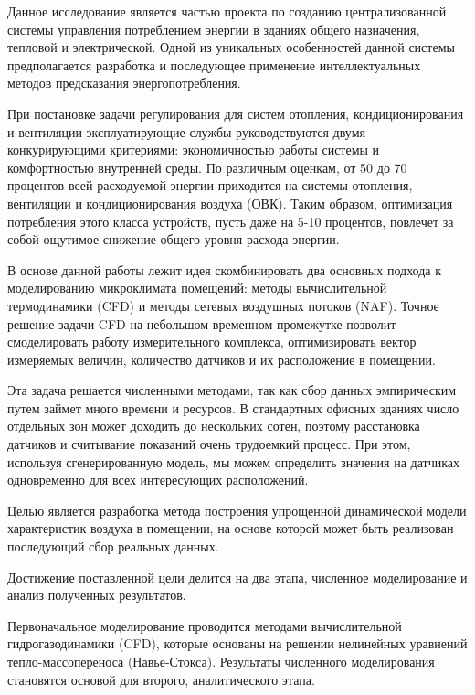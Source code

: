 
Данное исследование является частью проекта по созданию централизованной системы управления потреблением энергии в зданиях общего назначения, тепловой и электрической. Одной из уникальных особенностей данной системы предполагается разработка и последующее применение интеллектуальных методов предсказания энергопотребления.

При постановке задачи регулирования для систем отопления, кондиционирования и вентиляции эксплуатирующие службы руководствуются двумя конкурирующими критериями: экономичностью работы системы и комфортностью внутренней среды. По различным оценкам, от 50 до 70 процентов всей расходуемой энергии приходится на системы отопления, вентиляции и кондиционирования воздуха (ОВК). Таким образом, оптимизация потребления этого класса устройств, пусть даже на 5-10 процентов, повлечет за собой ощутимое снижение общего уровня расхода энергии. 

В основе данной работы лежит идея скомбинировать два основных подхода к моделированию микроклимата помещений: методы вычислительной термодинамики (CFD) и методы сетевых воздушных потоков (NAF). Точное решение задачи CFD на небольшом временном промежутке позволит смоделировать работу измерительного комплекса, оптимизировать вектор измеряемых величин, количество датчиков и их расположение в помещении. 

Эта задача решается численными методами, так как сбор данных эмпирическим путем займет много времени и ресурсов. В стандартных офисных зданиях число отдельных зон может доходить до нескольких сотен, поэтому расстановка датчиков и считывание показаний очень трудоемкий процесс. При этом, используя сгенерированную модель, мы можем определить значения на датчиках одновременно для всех интересующих расположений.


\newpage


Целью является разработка метода построения упрощенной динамической модели характеристик воздуха в помещении, на основе которой может быть реализован последующий сбор реальных данных. 

Достижение поставленной цели делится на два этапа, численное моделирование и анализ полученных результатов.

Первоначальное моделирование проводится методами вычислительной гидрогазодинамики (CFD), которые основаны на решении нелинейных уравнений тепло-массопереноса (Навье-Стокса). Результаты численного моделирования становятся основой для второго, аналитического этапа.

